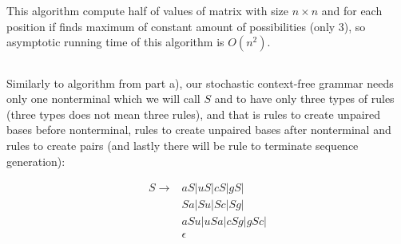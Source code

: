 \documentclass[a4paper]{article}
\begin{document}
	
	This algorithm compute half of values of matrix with size $n \times n$ and for each position if finds maximum of constant amount of possibilities (only 3), so asymptotic running time of this algorithm is $O(n^2)$.
	
	\subsection{}
	
	Similarly to algorithm from part a), our stochastic context-free grammar needs only one nonterminal which we will call $S$ and to have only three types of rules (three types does not mean three rules), and that is rules to create unpaired bases before nonterminal, rules to create unpaired bases after nonterminal and rules to create pairs (and lastly there will be rule to terminate sequence generation):
	
	\begin{align*}
		S \rightarrow & aS | uS | cS | gS |
		\\
		&Sa | Su | Sc | Sg | 
		\\
		&aSu | uSa | cSg | gSc | 
		\\
		&\epsilon 
	\end{align*}
	
\end{document}
